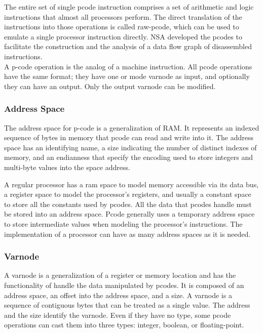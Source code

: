 The entire set of single pcode instruction comprises a set of arithmetic and logic instructions that almost all processors perform. The direct translation of the instructions into those operations is called raw-pcode, which can be used to emulate a single processor instruction directly. NSA developed the pcodes to facilitate the construction and the analysis of a data flow graph of disassembled instructions.\\

A p-code operation is the analog of a machine instruction.  All pcode operations have the same format; they have one or mode varnode as input, and optionally they can have an output. Only the output varnode can be modified. 

\subsubsection{Address Space}

The address space for p-code is a generalization of RAM. It represents an indexed sequence of bytes in memory that pcode can read and write into it. The address space has an identifying name, a size indicating the number of distinct indexes of memory, and an endianness that specify the encoding used to store integers and multi-byte values into the space address.

A regular processor has a ram space to model memory accessible via its data bus, a register space to model the processor's registers, and usually a constant space to store all the constants used by pcodes. All the data that pcodes handle must be stored into an address space. 
Pcode generally uses a temporary address space to store intermediate values when modeling the processor's instructions. 
The implementation of a processor can have as many address spaces as it is needed.


\subsubsection{Varnode}
A varnode is a generalization of a register or memory location and has the functionality of handle the data manipulated by pcodes. It is composed of an address space, an offset into the address space, and a size. 
A varnode is a sequence of contiguous bytes that can be treated as a single value. The address and the size identify the varnode. Even if they have no type, some pcode operations can cast them into three types: integer, boolean, or floating-point. 

